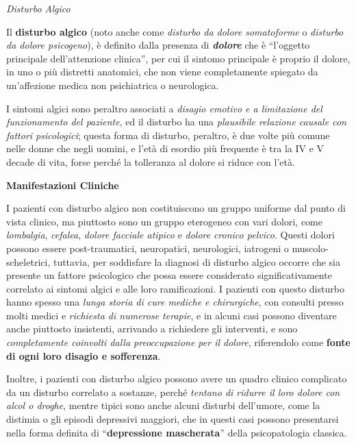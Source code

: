 \documentclass[]{article}
\begin{document}
\emph{Disturbo Algico}

Il \textbf{disturbo algico} (noto anche come \emph{disturbo da dolore
somatoforme} o \emph{disturbo da dolore psicogeno}), è definito dalla
presenza di \textbf{\emph{dolore}} che è ``l'oggetto principale
dell'attenzione clinica'', per cui il sintomo principale è proprio il
dolore, in uno o più distretti anatomici, che non viene completamente
spiegato da un'affezione medica non psichiatrica o neurologica.

I sintomi algici sono peraltro associati a \emph{disagio emotivo e a
limitazione del funzionamento del paziente}, ed il disturbo ha una
\emph{plausibile relazione causale con fattori psicologici}; questa
forma di disturbo, peraltro, è due volte più comune nelle donne che
negli uomini, e l'età di esordio più frequente è tra la IV e V decade di
vita, forse perché la tolleranza al dolore si riduce con l'età.

\textbf{Manifestazioni Cliniche}

I pazienti con disturbo algico non costituiscono un gruppo uniforme dal
punto di vista clinico, ma piuttosto sono un gruppo eterogeneo con vari
dolori, come \emph{lombalgia}, \emph{cefalea}, \emph{dolore facciale
atipico} e \emph{dolore} \emph{cronico pelvico}. Questi dolori possono
essere post-traumatici, neuropatici, neurologici, iatrogeni o
muscolo-scheletrici, tuttavia, per soddisfare la diagnosi di disturbo
algico occorre che sia presente un fattore psicologico che possa essere
considerato significativamente correlato ai sintomi algici e alle loro
ramificazioni. I pazienti con questo disturbo hanno spesso una
\emph{lunga storia di cure mediche e chirurgiche}, con consulti presso
molti medici e \emph{richiesta di numerose terapie}, e in alcuni casi
possono diventare anche piuttosto insistenti, arrivando a richiedere gli
interventi, e sono \emph{completamente coinvolti dalla preoccupazione
per il dolore}, riferendolo come \textbf{fonte di ogni loro disagio e
sofferenza}.

Inoltre, i pazienti con disturbo algico possono avere un quadro clinico
complicato da un disturbo correlato a sostanze, perché \emph{tentano di
ridurre il loro dolore con alcol o droghe}, mentre tipici sono anche
alcuni disturbi dell'umore, come la distimia o gli episodi depressivi
maggiori, che in questi casi possono presentarsi nella forma definita di
``\textbf{depressione mascherata}'' della psicopatologia classica.
\end{document}
